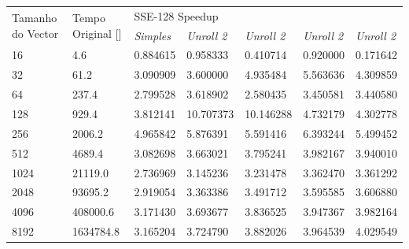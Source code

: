 \documentclass[a4paper]{article}
\begin{document}
	\begin{table}[h]
		\centering
		\begin{tabular}{lllllll}
\multirow{2}{*}{Tamanho do Vector} & \multirow{2}{*}{Tempo Original {[}{]}} & \multicolumn{5}{l}{SSE-128 Speedup}                                                              \\
                                   &                                        & \textit{Simples} & \textit{Unroll 2} & \textit{Unroll 2} & \textit{Unroll 2} & \textit{Unroll 2} \\
16                                 & 4.6                                    & 0.884615         & 0.958333          & 0.410714          & 0.920000          & 0.171642          \\
32                                 & 61.2                                   & 3.090909         & 3.600000          & 4.935484          & 5.563636          & 4.309859          \\
64                                 & 237.4                                  & 2.799528         & 3.618902          & 2.580435          & 3.450581          & 3.440580          \\
128                                & 929.4                                  & 3.812141         & 10.707373         & 10.146288         & 4.732179          & 4.302778          \\
256                                & 2006.2                                 & 4.965842         & 5.876391          & 5.591416          & 6.393244          & 5.499452          \\
512                                & 4689.4                                 & 3.082698         & 3.663021          & 3.795241          & 3.982167          & 3.940010          \\
1024                               & 21119.0                                & 2.736969         & 3.145236          & 3.231478          & 3.362470          & 3.361292          \\
2048                               & 93695.2                                & 2.919054         & 3.363386          & 3.491712          & 3.595585          & 3.606880          \\
4096                               & 408000.6                               & 3.171430         & 3.693677          & 3.836525          & 3.947367          & 3.982164          \\
8192                               & 1634784.8                              & 3.165204         & 3.724790          & 3.882026          & 3.964539          & 4.029549          \\

\end{tabular}
\end{table}
\end{document}
